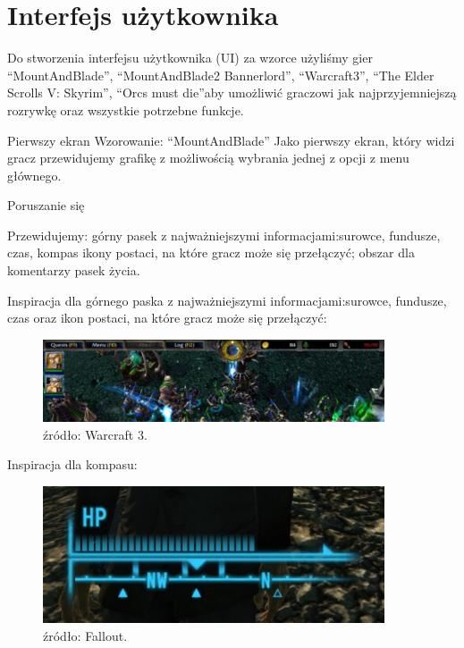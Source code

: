 \chapter{Interfejs użytkownika}\label{chap:ui}
Do stworzenia interfejsu użytkownika (UI) za wzorce użyliśmy gier “MountAndBlade”, “MountAndBlade2 Bannerlord”, “Warcraft3”, “The Elder Scrolls V: Skyrim”, “Orcs must die”aby umożliwić graczowi jak najprzyjemniejszą rozrywkę oraz wszystkie potrzebne funkcje.

Pierwszy ekran
Wzorowanie: “MountAndBlade”
Jako pierwszy ekran, który widzi gracz przewidujemy grafikę z możliwością wybrania jednej z opcji z menu głównego.

Poruszanie się

Przewidujemy:
górny pasek z najważniejszymi informacjami:surowce, fundusze, czas, kompas
ikony postaci, na które gracz może się przełączyć;
obszar dla komentarzy
pasek życia.

Inspiracja dla górnego paska z najważniejszymi informacjami:surowce, fundusze, czas oraz ikon postaci, na które gracz może się przełączyć:
\begin{figure}[htbp]
    \centering
    \includegraphics[width=0.9\textwidth]{images/ui/warcraft3.png}
    \caption{źródło: Warcraft 3.}\label{fig:Warcraft3}
\end{figure}

Inspiracja dla kompasu:
\begin{figure}[htbp]
    \centering
    \includegraphics[width=0.9\textwidth]{images/ui/compassSkyrim.png}
    \caption{źródło: Fallout.}\label{fig:Fallout}
\end{figure}

